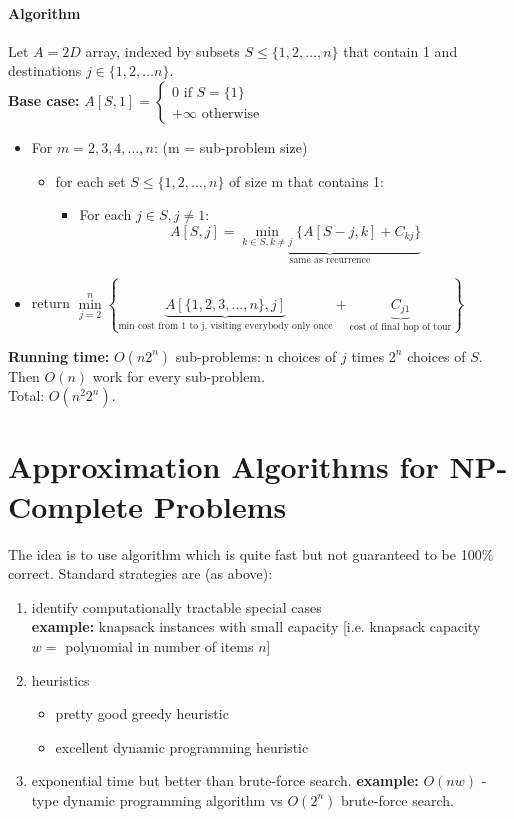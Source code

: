 \documentclass{scrartcl}
\begin{document}
\paragraph{Algorithm }
Let $A = 2D$ array, indexed by subsets $S \leq \{1, 2,\dots, n\}$ that contain 1
and destinations $j \in \{1, 2, \dots n\}$.\\
{\bf Base case: } $A[S, 1] = \left\{\begin{smallmatrix} 0 \text{ if } S = \{1\} \\ 
    +\infty \text{ otherwise } \end{smallmatrix} \right.$
\begin{itemize}
\item For $m = 2, 3, 4, \dots, n$: (m = sub-problem size)
  \begin{itemize}
  \item for each set $S \leq \{1, 2, \dots, n\}$ of size m that contains 1:
    \begin{itemize}
    \item For each $j \in S, j \neq 1$:
$$A[S,j]=\underbrace{\min \limits_{k \in S, k \neq j} \{A[S-j, k] + C_{kj}
  \}}_\text{same as recurrence} $$
    \end{itemize}
  \end{itemize}
\item return $\min \limits_{j=2}^n \left\{ \underbrace{A[\{1, 2, 3, \dots, n\},
      j]}_\text{min cost from 1 to j, visiting everybody only once} +
    \underbrace{C_{j1}}_\text{cost of final hop of tour} \right\} $ 
\end{itemize}
{\bf Running time: } $O(n 2^n)$ sub-problems: n choices of $j$ times $2^n$
choices of $S$. Then $O(n)$ work for every sub-problem.\\
Total: $O(n^2 2^n)$.

\section{Approximation Algorithms for NP-Complete Problems}
\label{sec:18-0}
The idea is to use algorithm which is quite fast but not guaranteed to be 100\%
correct. 
Standard strategies are (as above):
\begin{enumerate}
\item identify computationally tractable special cases\\
{\bf example: } knapsack instances with small capacity [i.e. knapsack capacity
$w = $ polynomial in number of items $n$]
\item heuristics 
  \begin{itemize}
  \item pretty good greedy heuristic
  \item excellent dynamic programming heuristic
  \end{itemize}
\item exponential time but better than brute-force search.
{\bf example: } $O(nw)$ - type dynamic programming algorithm vs $O(2^n)$
brute-force search.
\end{enumerate}
\end{document}
